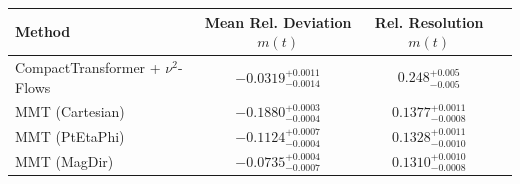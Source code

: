     \begin{tabular}{lccc}
        \toprule
        Method & Mean Rel. Deviation $m(t)$ & Rel. Resolution $m(t)$ \\
        \midrule
        CompactTransformer + $\nu^2$-Flows & $-0.0319^{+0.0011}_{-0.0014}$ & $0.248^{+0.005}_{-0.005}$ \\
        MMT (Cartesian) & $-0.1880^{+0.0003}_{-0.0004}$ & $0.1377^{+0.0011}_{-0.0008}$ \\
        MMT (PtEtaPhi) & $-0.1124^{+0.0007}_{-0.0004}$ & $0.1328^{+0.0011}_{-0.0010}$ \\
        MMT (MagDir) & $-0.0735^{+0.0004}_{-0.0007}$ & $0.1310^{+0.0010}_{-0.0008}$ \\
        \bottomrule
    \end{tabular}